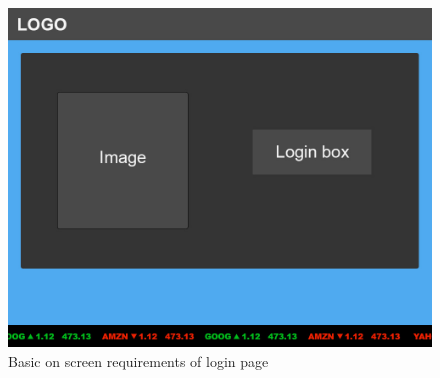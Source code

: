 \begin{figure}[H]
\centering
\includegraphics[width=5.5in]{./img/mock/loginmock.jpg}
\caption{Basic on screen requirements of login page}
\label{ui:mockup}
\end{figure}
